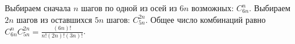 \documentclass{article}
\begin{document}
Выбираем сначала $n$ шагов по одной из осей из $6n$ возможных: $C_{6n}^n$. Выбираем $2n$ шагов из оставшихся $5n$ шагов: $C_{5n}^{2n}$. Общее число комбинаций равно $C_{6n}^n C_{5n}^{2n} = \frac{(6n)!}{n! (2n)! (3n)!}$.
\end{document}
